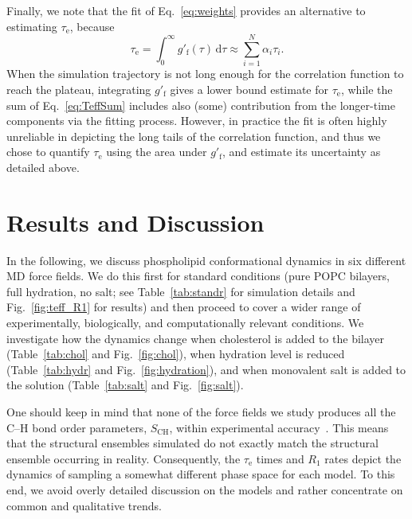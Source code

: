 \documentclass[journal=jpcbfk,manuscript=article,layout=twocolumn]{achemso}
\begin{document}
Finally, we note that the fit of Eq.~\eqref{eq:weights} provides an alternative
to estimating $\tau_\mathrm{e}$, because
\begin{equation}
\label{eq:TeffSum}
\tau_\mathrm{e}
	=\int_0^\infty\!g'_\mathrm f(\tau)\,\mathrm d\tau
	\approx\sum_{i=1}^{N}\alpha_{i}\tau_{i}.
\end{equation}
When the simulation trajectory is not long enough for the correlation function to reach the plateau, integrating $g'_\mathrm f$ gives a lower bound estimate for $\tau_\mathrm{e}$, while the sum of Eq.~\eqref{eq:TeffSum} includes also (some) contribution from the longer-time components via the fitting process.
However, in practice the fit is often highly unreliable in depicting the long tails of the correlation function, and thus we chose to quantify $\tau_\mathrm{e}$ using the area under $g'_\mathrm f$, and estimate its uncertainty as detailed above.



\section{Results and Discussion}

In the following, we discuss phospholipid conformational  dynamics in
six different MD force fields. We do this first for %
standard conditions (pure POPC bilayers, full hydration, no salt;
see Table~\ref{tab:standr} for simulation details and Fig.~\ref{fig:teff_R1} for results)
%
and then proceed to
cover a wider range of experimentally, biologically, and computationally relevant conditions. We investigate how the dynamics change when cholesterol is added to the bilayer (Table~\ref{tab:chol} and Fig.~\ref{fig:chol}), when hydration level is reduced (Table~\ref{tab:hydr} and Fig.~\ref{fig:hydration}), and when monovalent salt is added to the solution (Table~\ref{tab:salt} and Fig.~\ref{fig:salt}).

One should keep in mind that none of the force fields we study
produces all the C--H bond order parameters, $S_\mathrm{CH}$, within experimental accuracy~\cite{botan15}.
%
%
This means that the structural ensembles simulated do not exactly match
the structural ensemble occurring in reality.%
%
Consequently, the
$\tau_\mathrm{e}$ times and $R_1$ rates
depict the dynamics of sampling a somewhat different phase space
for each model. %
%
To this end, we avoid overly detailed discussion on the models and rather concentrate on common and qualitative trends.
\end{document}
